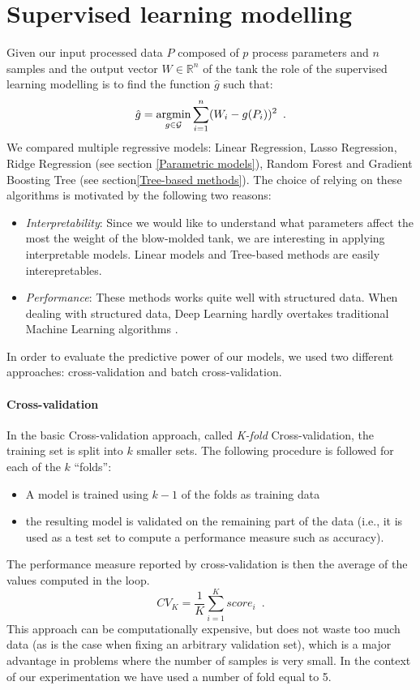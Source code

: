 \section{Supervised learning modelling}

Given our input processed data $P$ composed of $p$ process parameters and $n$ samples and the output vector $W \in \mathds{R}^{n}$ of the tank the role of the supervised learning modelling is to find the function $\hat{g}$ such that:
%
\begin{equation}
    \hat{g} = \operatorname*{argmin}_{g \in \mathcal{G}} \sum_{i=1}^n (W_{i} - g(P_{i}))^{2} \enspace.
\end{equation}
%
We compared multiple regressive models: Linear Regression, Lasso Regression, Ridge Regression (see section \ref{Parametric models}), Random Forest and Gradient Boosting Tree (see section\ref{Tree-based methods}). The choice of relying on these algorithms is motivated by the following two reasons:
%
\begin{itemize}
    \item \textit{Interpretability}: Since we would like to understand what parameters affect the most the weight of the blow-molded tank, we are interesting in applying interpretable models. Linear models and Tree-based methods are easily interepretables.
    \item \textit{Performance}: These methods works quite well with structured data. When dealing with structured data, Deep Learning hardly overtakes traditional Machine Learning algorithms \citep{shwartz2021tabular}. 
\end{itemize}
%
In order to evaluate the predictive power of our models, we used two different approaches: cross-validation and batch cross-validation. 

\paragraph{Cross-validation}

In the basic Cross-validation approach, called \textit{K-fold} Cross-validation, the training set is split into $k$ smaller sets. The following procedure is followed for each of the $k$ “folds”:
%
\begin{itemize}
    \item A model is trained using $k - 1$ of the folds as training data
    \item the resulting model is validated on the remaining part of the data (i.e., it is used as a test set to compute a performance measure such as accuracy).
\end{itemize}
%
The performance measure reported by cross-validation is then the average of the values computed in the loop.
%
\begin{equation}
    CV_{K} = \frac{1}{K}\sum_{i=1}^{K}score_{i}
    \enspace.
\end{equation}
%
This approach can be computationally expensive, but does not waste too much data (as is the case when fixing an arbitrary validation set), which is a major advantage in problems where the number of samples is very small. In the context of our experimentation we have used a number of fold equal to 5.

